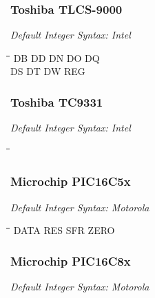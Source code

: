 \subsubsection{Toshiba TLCS-9000}

{\em Default Integer Syntax: Intel}

{\tt\begin{tabbing}
\hspace{3cm}\=\hspace{3cm}\=\hspace{3cm}\=\hspace{3cm}\=\kill
DB         \> DD          \> DN         \> DO         \> DQ \\
DS         \> DT          \> DW         \> REG \\
\end{tabbing}}

\subsubsection{Toshiba TC9331}

{\em Default Integer Syntax: Intel}

{\tt\begin{tabbing}
\hspace{3cm}\=\hspace{3cm}\=\hspace{3cm}\=\hspace{3cm}\=\kill
\end{tabbing}}

\subsubsection{Microchip PIC16C5x}

{\em Default Integer Syntax: Motorola}

{\tt\begin{tabbing}
\hspace{3cm}\=\hspace{3cm}\=\hspace{3cm}\=\hspace{3cm}\=\kill
DATA       \> RES         \> SFR         \> ZERO \\
\end{tabbing}}

\subsubsection{Microchip PIC16C8x}

{\em Default Integer Syntax: Motorola}

